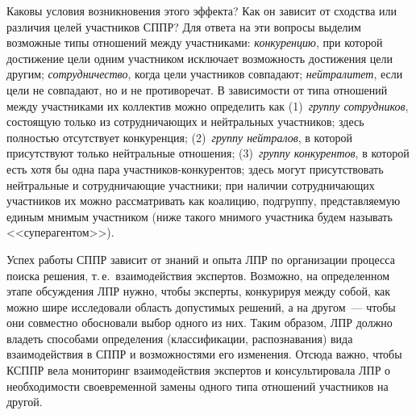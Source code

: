 \begin{multicols}{2}
  Каковы условия возникновения этого эффекта? Как он зависит от сходства 
или различия целей участников СППР? Для ответа на эти вопросы выделим 
возможные типы отношений между участниками: \textit{конкуренцию}, при 
которой достижение цели одним участником исключает возможность 
достижения цели другим; \textit{сотрудничество}, когда цели участников 
совпадают; \textit{нейтралитет}, если цели не совпадают, но и не 
противоречат. В зависимости от типа отношений между участниками их
коллектив можно определить как (1)~\textit{группу сотрудников}, 
состоящую только из сотрудничающих и нейтральных участников; здесь 
полностью отсутствует конкуренция; (2)~\textit{группу нейтралов}, в которой 
присутствуют %
 только нейтральные отношения; (3)~\textit{группу конкурентов}, 
в которой есть хотя бы одна пара участников-конкурентов; здесь могут 
присутствовать нейтральные и сотрудничающие участники; при наличии %
сотрудничающих участников их можно рассматривать как коалицию, 
подгруппу, представляемую единым мнимым участником (ниже такого 
мнимого участника будем называть <<суперагентом>>).
  
  Успех работы СППР зависит от знаний и опыта ЛПР по организации 
процесса поиска решения, т.\,е.\ взаимодействия экспертов. Возможно, на 
определенном этапе обсуждения ЛПР нужно, чтобы эксперты, конкурируя 
между собой, как можно шире исследовали область допустимых решений, а на 
другом~--- чтобы они совместно обосновали выбор одного из них. Таким 
образом, ЛПР должно владеть способами определения (классификации, 
распознавания) вида взаимодействия в СППР и возможностями его изменения. 
Отсюда важно, чтобы \mbox{КСППР} вела мониторинг взаимодействия экспертов и 
консультировала ЛПР о не\-об\-хо\-ди\-мости своевременной замены одного типа 
отношений участников на другой.

  \begin{figure*} %
    \begin{center}
\vspace*{1pt}
\mbox{%
\epsfxsize=116.917mm
}
\end{center}
\vspace*{-9pt}
\end{figure*}
  
\vspace*{-6pt}


\end{multicols}
